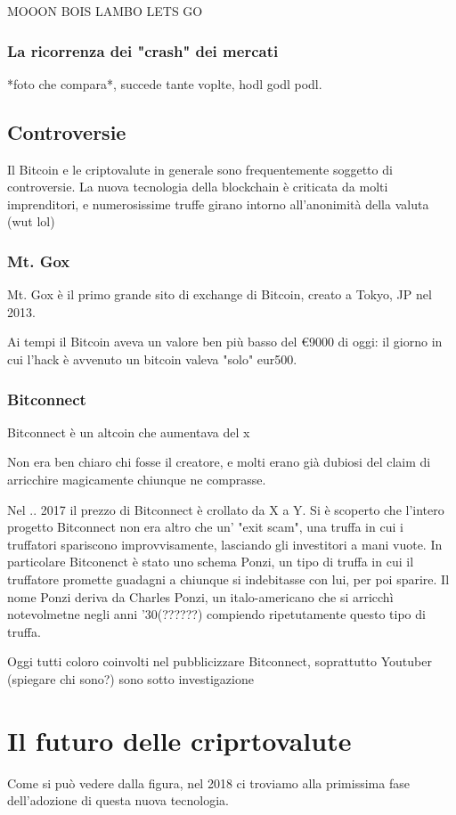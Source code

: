 \documentclass {article}
\begin{document}
MOOON BOIS LAMBO LETS GO



\subsubsection {La ricorrenza dei "crash" dei mercati}



*foto che compara*, succede tante voplte, hodl godl podl.



\subsection {Controversie}



Il Bitcoin e le criptovalute in generale sono frequentemente soggetto di controversie. La nuova tecnologia della blockchain è criticata da molti imprenditori, e numerosissime truffe girano intorno all'anonimità della valuta (wut lol)



\subsubsection {Mt. Gox}



Mt. Gox è il primo grande sito di exchange di Bitcoin, creato a Tokyo, JP nel 2013.

Ai tempi il Bitcoin aveva un valore ben più basso del €9000 di oggi: il giorno in cui l'hack è avvenuto un bitcoin valeva "solo" eur500.



\subsubsection {Bitconnect}



Bitconnect è un altcoin che aumentava del x%

Non era ben chiaro chi fosse il creatore, e molti erano già dubiosi del claim di arricchire magicamente chiunque ne comprasse.

Nel .. 2017 il prezzo di Bitconnect è crollato da X a Y. Si è scoperto che l'intero progetto Bitconnect non era altro che un' "exit scam", una truffa in cui i truffatori spariscono improvvisamente, lasciando gli investitori a mani vuote. In particolare Bitconenct è stato uno schema Ponzi, un tipo di truffa in cui il truffatore promette guadagni a chiunque si indebitasse con lui, per poi sparire. Il nome Ponzi deriva da Charles Ponzi, un italo-americano che si arricchì notevolmetne negli anni '30(??????) compiendo ripetutamente questo tipo di truffa.

Oggi tutti coloro coinvolti nel pubblicizzare Bitconnect, soprattutto Youtuber (spiegare chi sono?) sono sotto investigazione



\section {Il futuro delle criprtovalute}



Come si può vedere dalla figura, nel 2018 ci troviamo alla primissima fase dell'adozione di questa nuova tecnologia.
\end{document}
